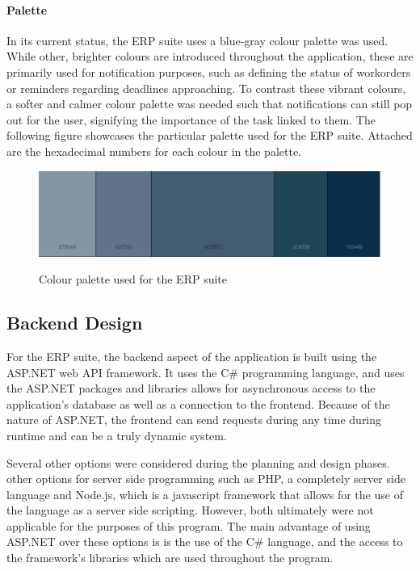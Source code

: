 {{{{{{{{\paragraph{Palette}
In its current status, the ERP suite uses a blue-gray colour palette was used. While other, brighter colours are introduced throughout the application, these are primarily used for notification purposes, such as defining the status of workorders or reminders regarding deadlines approaching. To contrast these vibrant colours, a softer and calmer colour palette was needed such that notifications can still pop out for the user, signifying the importance of the task linked to them. The following figure showcases the particular palette used for the ERP suite. Attached are the hexadecimal numbers for each colour in the palette. 
\begin{figure}[H]
	\centering
	\includegraphics[width=5in]{palette.png}\\
	\caption{Colour palette used for the ERP suite}
	\label{fig:tobias}
\end{figure}

\subsection{Backend Design}
For the ERP suite, the backend aspect of the application is built using the ASP.NET web API framework. It uses the C\# programming language, and uses the ASP.NET packages and libraries allows for asynchronous access to the application's database as well as a connection to the frontend. Because of the nature of ASP.NET, the frontend can send requests during any time during runtime and can be a truly dynamic system.
\newline
{\setlength{\parindent}{0cm} 

Several other options were considered during the planning and design phases. other options for server side programming such as PHP, a completely server side language and Node.js, which is a javascript framework that allows for the use of the language as a server side scripting. However, both ultimately were not applicable for the purposes of this program. The main advantage of using ASP.NET over these options is is the use of the C\# language, and the access to the framework's libraries which are used throughout the program. 
\newline
{\setlength{\parindent}{0cm} 

}}}}}}}}}}
